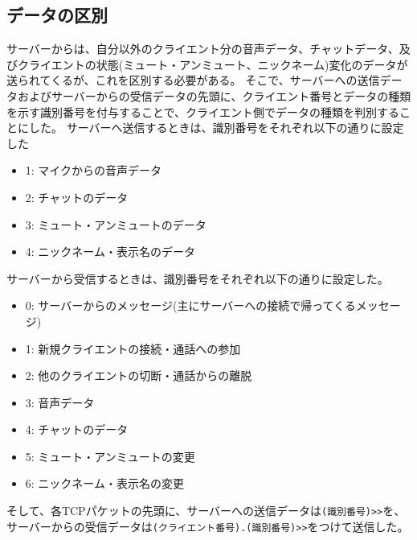 \documentclass[a4paper]{ltjsarticle}
\begin{document}
\subsection{データの区別}
サーバーからは、自分以外のクライエント分の音声データ、チャットデータ、及びクライエントの状態(ミュート・アンミュート、ニックネーム)変化のデータが送られてくるが、これを区別する必要がある。
そこで、サーバーへの送信データおよびサーバーからの受信データの先頭に、クライエント番号とデータの種類を示す識別番号を付与することで、クライエント側でデータの種類を判別することにした。
サーバーへ送信するときは、識別番号をそれぞれ以下の通りに設定した
\begin{itemize}
    \item 1: マイクからの音声データ
    \item 2: チャットのデータ
    \item 3: ミュート・アンミュートのデータ
    \item 4: ニックネーム・表示名のデータ
\end{itemize}
サーバーから受信するときは、識別番号をそれぞれ以下の通りに設定した。
\begin{itemize}
    \item 0: サーバーからのメッセージ(主にサーバーへの接続で帰ってくるメッセージ)
    \item 1: 新規クライエントの接続・通話への参加
    \item 2: 他のクライエントの切断・通話からの離脱
    \item 3: 音声データ
    \item 4: チャットのデータ
    \item 5: ミュート・アンミュートの変更
    \item 6: ニックネーム・表示名の変更
\end{itemize}
そして、各TCPパケットの先頭に、サーバーへの送信データは\verb|(識別番号)>>|を、サーバーからの受信データは\verb|(クライエント番号).(識別番号)>>|をつけて送信した。
\end{document}
